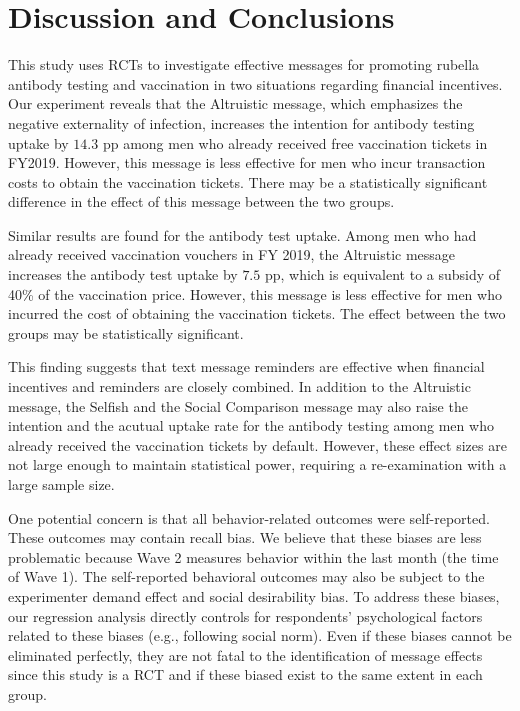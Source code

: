 \documentclass[
]{article}
\begin{document}
\hypertarget{conclusion}{%
\section{Discussion and Conclusions}\label{conclusion}}

This study uses RCTs to investigate effective messages for promoting rubella antibody testing and vaccination in two situations regarding financial incentives. Our experiment reveals that the Altruistic message, which emphasizes the negative externality of infection, increases the intention for antibody testing uptake by \(14.3\) pp among men who already received free vaccination tickets in FY2019. However, this message is less effective for men who incur transaction costs to obtain the vaccination tickets. There may be a statistically significant difference in the effect of this message between the two groups.

Similar results are found for the antibody test uptake. Among men who had already received vaccination vouchers in FY 2019, the Altruistic message increases the antibody test uptake by \(7.5\) pp, which is equivalent to a subsidy of 40\% of the vaccination price. However, this message is less effective for men who incurred the cost of obtaining the vaccination tickets. The effect between the two groups may be statistically significant.

This finding suggests that text message reminders are effective when financial incentives and reminders are closely combined. In addition to the Altruistic message, the Selfish and the Social Comparison message may also raise the intention and the acutual uptake rate for the antibody testing among men who already received the vaccination tickets by default. However, these effect sizes are not large enough to maintain statistical power, requiring a re-examination with a large sample size.

One potential concern is that all behavior-related outcomes were self-reported. These outcomes may contain recall bias. We believe that these biases are less problematic because Wave 2 measures behavior within the last month (the time of Wave 1). The self-reported behavioral outcomes may also be subject to the experimenter demand effect and social desirability bias. To address these biases, our regression analysis directly controls for respondents' psychological factors related to these biases (e.g., following social norm). Even if these biases cannot be eliminated perfectly, they are not fatal to the identification of message effects since this study is a RCT and if these biased exist to the same extent in each group.
\end{document}
